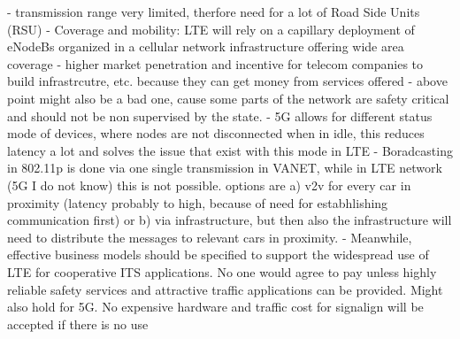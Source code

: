 \documentclass[conference,12pt,onecolumn]{IEEEtran}
\begin{document}
- transmission range very limited, therfore need for a lot of Road Side Units (RSU) \cite{araniti2013}
- Coverage and mobility: LTE will rely on a capillary deployment of eNodeBs organized in a cellular network infrastructure offering wide area coverage \cite{araniti2013}
- higher market penetration and incentive for telecom companies to build infrastrcutre, etc. because they can get money from services offered \cite{lee2016}
- above point might also be a bad one, cause some parts of the network are safety critical and should not be non supervised by the state.
- 5G allows for different status mode of devices, where nodes are not disconnected when in idle, this reduces latency a lot and solves the issue that exist with this mode in LTE \cite{araniti2013}
- Boradcasting in 802.11p is done via one single transmission in VANET, while in LTE network (5G I do not know) this is not possible. options are a) v2v for every car in proximity (latency probably to high, because of need for estabhlishing communication first) or b) via infrastructure, but then also the infrastructure will need to distribute the messages to relevant cars in proximity. \cite{araniti2013}
- Meanwhile, effective business models should be specified to support the widespread use of LTE for cooperative ITS applications. No one would agree to pay unless highly reliable safety services and attractive traffic applications can be provided. \cite{araniti2013} Might also hold for 5G. No expensive hardware and traffic cost for signalign will be accepted if there is no use
\end{document}
